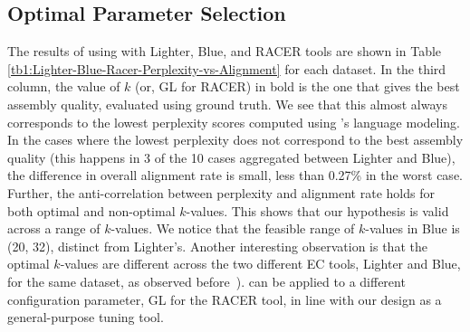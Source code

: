 \vspace{-12pt}
\subsection{Optimal Parameter Selection}
\vspace{-8pt}
The results of using \name with Lighter, Blue, and RACER tools are shown in Table \ref{tb1:Lighter-Blue-Racer-Perplexity-vs-Alignment} for each dataset. In the third column, the value of $k$ (or, GL for RACER) in bold is the one that gives the best assembly quality, evaluated using ground truth.
We see that this almost always corresponds to the lowest perplexity scores computed using \name's language modeling. %
In the cases where the lowest perplexity does not correspond to the best assembly quality (this happens in 3 of the 10 cases aggregated between Lighter and Blue), the difference in overall alignment rate is small, less than 0.27\% in the worst case.  
Further, the anti-correlation between perplexity and alignment rate holds for both optimal and non-optimal $k$-values. 
This shows that our hypothesis is valid across a range of $k$-values. We notice that the feasible range of $k$-values in Blue is (20, 32), distinct from Lighter's. Another interesting observation is that the optimal $k$-values are different across the two different EC tools, Lighter and Blue, for the same dataset, as observed before~\cite{song2014lighter}). 
\name can be applied to a different configuration parameter, GL for the RACER tool, in line with our design as a general-purpose tuning tool.

